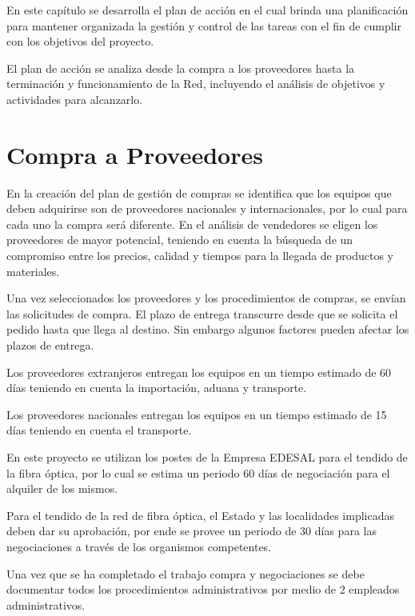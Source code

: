 En este capítulo se desarrolla el plan de acción en el cual brinda una planificación para mantener organizada la gestión y control de las tareas con el fin de cumplir con los objetivos del proyecto.

El plan de acción se analiza desde la compra a los proveedores hasta la terminación y funcionamiento de la Red, incluyendo el análisis de objetivos y actividades para alcanzarlo.

\section{Compra a Proveedores}
En la creación del plan de gestión de compras se identifica que los equipos que deben adquirirse son de proveedores nacionales y internacionales, por lo cual para cada uno la compra será diferente. En el análisis de vendedores se eligen los proveedores de mayor potencial, teniendo en cuenta la búsqueda de un compromiso entre los precios, calidad y tiempos para la llegada de productos y materiales.

Una vez seleccionados los proveedores y los procedimientos de compras,  se envían las solicitudes de compra. El plazo de entrega transcurre desde que se solicita el pedido hasta que llega al destino. Sin embargo algunos factores pueden afectar los plazos de entrega.

Los proveedores extranjeros entregan los equipos en un tiempo estimado de 60 días teniendo en cuenta la importación, aduana y transporte. 

Los proveedores nacionales entregan los equipos en un tiempo estimado de 15 días teniendo en cuenta el transporte.

En este proyecto se utilizan los postes de la Empresa EDESAL para el tendido de la fibra óptica, por lo cual se estima un periodo 60 días de negociación para el alquiler de los mismos.

Para el tendido de la red de fibra óptica, el Estado y las localidades implicadas deben dar su aprobación, por ende se provee un periodo de 30 días para las negociaciones a través de los organismos competentes.

Una vez que se ha completado el trabajo compra y negociaciones se debe documentar todos los procedimientos administrativos por medio de 2 empleados administrativos.

